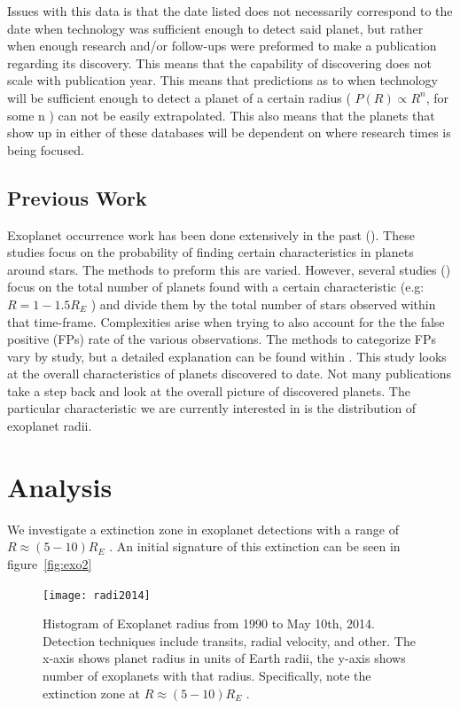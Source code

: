 \documentclass[
10pt, %
a4paper, %
oneside, %
headinclude,footinclude, %
BCOR5mm, %
]{scrartcl}
\begin{document}
Issues with this data is that the date listed does not necessarily correspond to the date when technology was sufficient enough to detect said planet, but rather when enough research and/or follow-ups were preformed to make a publication regarding its discovery. This means that the capability of discovering does not scale with publication year. This means that predictions as to when technology will be sufficient enough to detect a planet of a certain radius ( $P(R)\propto{}R^{n}$, for some n ) can not be easily extrapolated. This also means that the planets that show up in either of these databases will be dependent on where research times is being focused.
\subsection{Previous Work}
Exoplanet occurrence work has been done extensively in the past (\cite{pug,Marcey1,occ2,occ1}). These studies focus on the probability of finding certain characteristics in planets around stars. The methods to preform this are varied. However, several studies (\cite{occ2,pug,Marcey1}) focus on the total number of planets found with a certain characteristic (e.g: $R=1-1.5R_{E}$ ) and divide them by the total number of stars observed within that time-frame. Complexities arise when trying to also account for the the false positive (FPs) rate of the various observations. The methods to categorize FPs vary by study, but a detailed explanation can be found within \cite{pug}.
This study looks at the overall characteristics of planets discovered to date. Not many publications take a step back and look at the overall picture of discovered planets. The particular characteristic we are currently interested in is the distribution of exoplanet radii. 
\section{Analysis}
We investigate a extinction zone in exoplanet detections with a range of $R \approx (5 - 10) R_{E}$ . An initial signature of this extinction can be seen in figure~\vref{fig:exo2}
\begin{figure}[tb]
\centering 
\texttt{[image: radi2014]} 
\caption[Exoplanet Radii]{Histogram of Exoplanet radius from 1990 to May 10th, 2014. Detection techniques include transits, radial velocity, and other. The x-axis shows planet radius in units of Earth radii, the y-axis shows number of exoplanets with that radius. Specifically, note the extinction zone at $R \approx (5 - 10) R_{E}$ .}
\label{fig:exo2} 
\end{figure}
\end{document}
